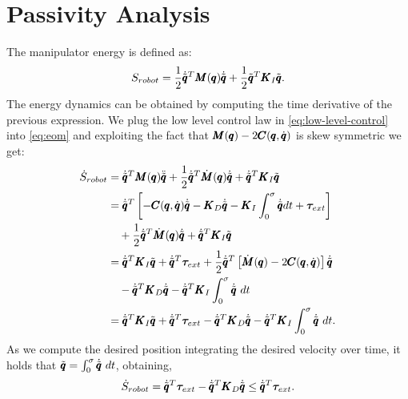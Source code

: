 \section{Passivity Analysis}\label{app:passivity_analysis}
The manipulator energy is defined as:
\begin{equation}
    S_{robot} = \frac{1}{2} \dot{\tilde{\pmb{q}}}^T \pmb{M}(\pmb{q}) \dot{\tilde{\pmb{q}}} + \frac{1}{2} \tilde{\pmb{q}}^T \pmb{K}_I \tilde{\pmb{q}}.
\end{equation}
The energy dynamics can be obtained by computing the time derivative of the previous expression. We plug the low level control law in \eqref{eq:low-level-control} into \eqref{eq:eom} and exploiting the fact that $\pmb{M}(\pmb{q}) - 2 \pmb{C}(\pmb{q}, \dot{\pmb{q}})$ is skew symmetric we get:
\begin{equation}
\begin{aligned}
    \dot{S}_{robot} &= \dconfigRobotError^T \massMatrix \ddconfigRobotError + \frac{1}{2} \dconfigRobotError^T \dot{\matr{M}}(\configRobot) \dconfigRobotError + \dconfigRobotError^T \matr{K}_I \configRobotError \\
    &= \dconfigRobotError^T \left[ -\coriolis \dconfigRobotError -  \matr{K}_D \dconfigRobotError - \matr{K}_I \int_{0}^{\sigma} \dconfigRobotError dt + \externalTorque \right] \\
    &\quad + \frac{1}{2} \dconfigRobotError^T \dot{\matr{M}}(\configRobot) \dconfigRobotError + \dconfigRobotError^T \matr{K}_I \configRobotError \\
    &= \dconfigRobotError^T \matr{K}_I \configRobotError + \dconfigRobotError^T \externalTorque + \frac{1}{2} \dconfigRobotError^T\left[ \dot{\matr{M}}(\configRobot) - 2\coriolis \right] \dconfigRobotError \\
    &\quad - \dconfigRobotError^T \matr{K}_D \dconfigRobotError  - \dconfigRobotError^T \matr{K}_I \int^{\sigma}_{0} \dconfigRobotError\ dt\\
    &= \dconfigRobotError^T \matr{K}_I \configRobotError + \dconfigRobotError^T \externalTorque - \dconfigRobotError^T \matr{K}_D \dconfigRobotError -  \dconfigRobotError^T \matr{K}_I \int^{\sigma}_{0} \dconfigRobotError\ dt.  
\end{aligned}
\end{equation}
As we compute the desired position integrating the desired velocity over time, it holds that $\tilde{\pmb{q}} = \int^{\sigma}_{0}
\dot{\tilde{\pmb{q}}}\ dt$, obtaining,
\begin{equation}
    \dot{S}_{robot} = \dot{\tilde{\pmb{q}}}^T \boldsymbol{\tau}_{ext} - \dot{\tilde{\pmb{q}}}^T \pmb{K}_D \dot{\tilde{\pmb{q}}} \leq \dot{\tilde{\pmb{q}}}^T \boldsymbol{\tau}_{ext}. 
\end{equation}

